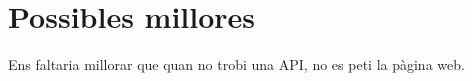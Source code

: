 \section{Possibles millores}

Ens faltaria millorar que quan no trobi una API, no es peti la pàgina web.
